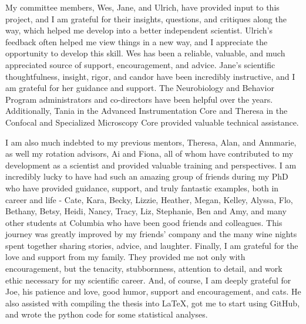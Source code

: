 My committee members, Wes, Jane, and Ulrich, have provided input to this project, and I am grateful for their insights, questions, and critiques along the way, which helped me develop into a better independent scientist.
Ulrich's feedback often helped me view things in a new way, and I appreciate the opportunity to develop this skill. 
Wes has been a reliable, valuable, and much appreciated source of support, encouragement, and advice.
Jane's scientific thoughtfulness, insight, rigor, and candor have been incredibly instructive, and I am grateful for her guidance and support.
The Neurobiology and Behavior Program administrators and co-directors have been helpful over the years.
Additionally, Tania in the Advanced Instrumentation Core and Theresa in the Confocal and Specialized Microscopy Core provided valuable technical assistance.

I am also much indebted to my previous mentors, Theresa, Alan, and Annmarie, as well my rotation advisors, Ai and Fiona, all of whom have contributed to my development as a scientist and provided valuable training and perspectives.
I am incredibly lucky to have had such an amazing group of friends during my PhD who have provided guidance, support, and truly fantastic examples, both in career and life - Cate, Kara, Becky, Lizzie, Heather, Megan, Kelley, Alyssa, Flo, Bethany, Betsy, Heidi, Nancy, Tracy, Liz, Stephanie, Ben and Amy, and many other students at Columbia who have been good friends and colleagues.
This journey was greatly improved by my friends' company and the many wine nights spent together sharing stories, advice, and laughter.
Finally, I am grateful for the love and support from my family.
They provided me not only with encouragement, but the tenacity, stubbornness, attention to detail, and work ethic necessary for my scientific career.
And, of course, I am deeply grateful for Joe, his patience and love, good humor, support and encouragement, and cats.
He also assisted with compiling the thesis into \LaTeX, got me to start using GitHub, and wrote the python code for some statistical analyses.